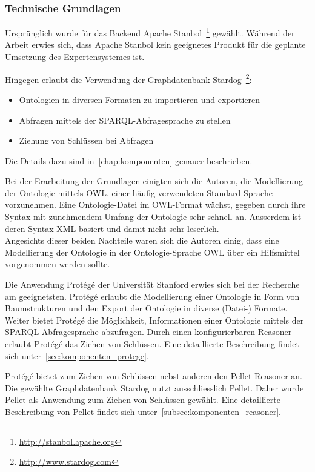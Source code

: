 \subsubsection{Technische Grundlagen}
\label{ssubsec:vorgehen:grundlagen:technisch}
Ursprünglich wurde für das Backend Apache Stanbol~\footnote{\url{http://stanbol.apache.org}} gewählt. Während der Arbeit erwies sich, dass Apache Stanbol kein geeignetes Produkt für die geplante Umsetzung des Expertensystemes ist.

Hingegen erlaubt die Verwendung der Graphdatenbank Stardog~\footnote{\url{http://www.stardog.com}}:
\begin{itemize}
    \item Ontologien in diversen Formaten zu importieren und exportieren
    \item Abfragen mittels der SPARQL-Abfragesprache zu stellen
    \item Ziehung von Schlüssen bei Abfragen
\end{itemize}
Die Details dazu sind in~\autoref{chap:komponenten} genauer beschrieben.

Bei der Erarbeitung der Grundlagen einigten sich die Autoren, die Modellierung der Ontologie mittels OWL, einer häufig verwendeten Standard-Sprache vorzunehmen. Eine Ontologie-Datei im OWL-Format wächst, gegeben durch ihre Syntax mit zunehmendem Umfang der Ontologie sehr schnell an. Ausserdem ist deren Syntax XML-basiert und damit nicht sehr leserlich.\\
Angesichts dieser beiden Nachteile waren sich die Autoren einig, dass eine Modellierung der Ontologie in der Ontologie-Sprache OWL über ein Hilfsmittel vorgenommen werden sollte.

Die Anwendung Protégé der Universität Stanford erwies sich bei der Recherche am geeignetsten. Protégé erlaubt die Modellierung einer Ontologie in Form von Baumstrukturen und den Export der Ontologie in diverse (Datei-) Formate. Weiter bietet Protégé die Möglichkeit, Informationen einer Ontologie mittels der SPARQL-Abfragesprache abzufragen. Durch einen konfigurierbaren Reasoner erlaubt Protégé das Ziehen von Schlüssen. Eine detaillierte Beschreibung findet sich unter~\autoref{sec:komponenten_protege}.

Protégé bietet zum Ziehen von Schlüssen nebst anderen den Pellet-Reasoner an. Die gewählte Graphdatenbank Stardog nutzt ausschliesslich Pellet. Daher wurde Pellet als Anwendung zum Ziehen von Schlüssen gewählt. Eine detaillierte Beschreibung von Pellet findet sich unter~\autoref{subsec:komponenten_reasoner}.

